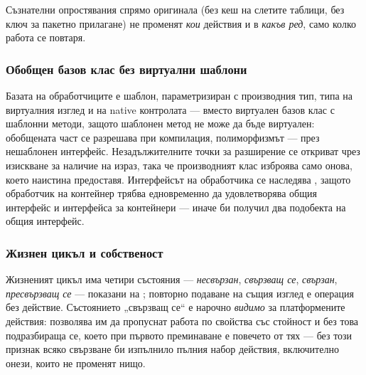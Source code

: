 Съзнателни опростявания спрямо оригинала (без кеш на слетите таблици, без ключ за пакетно
прилагане) не променят \emph{кои} действия и в \emph{какъв ред}, само колко работа се
повтаря.

\subsubsection{Обобщен базов клас без виртуални шаблони}

Базата на обработчиците е шаблон, параметризиран с производния тип, типа на виртуалния
изглед и на native контролата --- вместо виртуален базов клас с шаблонни методи,
защото шаблонен метод не може да бъде виртуален: обобщената част се разрешава при
компилация, полиморфизмът --- през нешаблонен интерфейс. Незадължителните точки за
разширение се откриват чрез изискване за наличие на израз, така че производният клас
изброява само онова, което наистина предоставя. Интерфейсът на обработчика се наследява
, защото обработчик на контейнер трябва едновременно да удовлетворява
общия интерфейс и интерфейса за контейнери --- иначе би получил два подобекта на общия
интерфейс.

\subsubsection{Жизнен цикъл и собственост}

Жизненият цикъл има четири състояния --- \emph{несвързан}, \emph{свързващ се},
\emph{свързан}, \emph{пресвързващ се} --- показани на ;
повторно подаване на същия изглед е операция без действие. Състоянието „свързващ се“ е
нарочно \emph{видимо} за платформените действия: позволява им да пропуснат работа по
свойства със стойност и без това подразбираща се, което при първото преминаване е
повечето от тях --- без този признак всяко свързване би изпълнило пълния набор действия,
включително онези, които не променят нищо.

